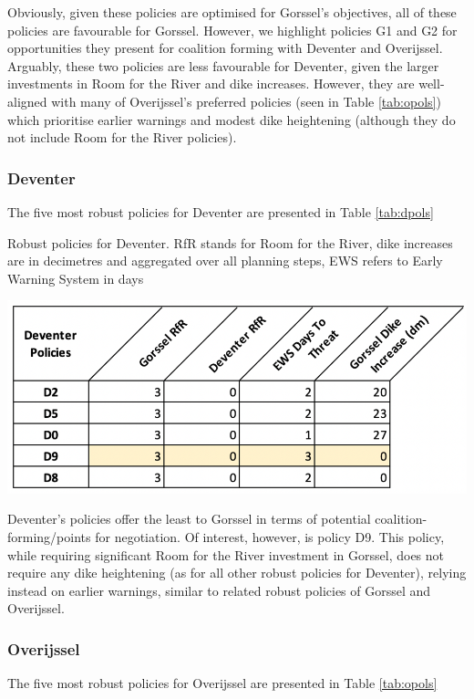 Obviously, given these policies are optimised for Gorssel's objectives, all of these policies are favourable for Gorssel. However, we highlight policies G1 and G2 for opportunities they present for coalition forming with Deventer and Overijssel. Arguably, these two policies are less favourable for Deventer, given the larger investments in Room for the River and dike increases. However, they are well-aligned with many of Overijssel's preferred policies (seen in Table \ref{tab:opols}) which prioritise earlier warnings and modest dike heightening (although they do not include Room for the River policies).

\subsubsection{Deventer}
The five most robust policies for Deventer are presented in Table \ref{tab:dpols}

\begin{table}[h!]
  \centering
  \captionsetup{justification=centering,margin=2cm}
  \caption{Robust policies for Deventer. RfR stands for Room for the River, dike increases are in decimetres and aggregated over all planning steps, EWS refers to Early Warning System in days}
  \label{tab:dpols}
  \includegraphics[width=0.8\linewidth]{report/figures/dpols.png}
\end{table}

Deventer's policies offer the least to Gorssel in terms of potential coalition-forming/points for negotiation. Of interest, however, is policy D9. This policy, while requiring significant Room for the River investment in Gorssel, does not require any dike heightening (as for all other robust policies for Deventer), relying instead on earlier warnings, similar to related robust policies of Gorssel and Overijssel.

\subsubsection{Overijssel}
The five most robust policies for Overijssel are presented in Table \ref{tab:opols}

